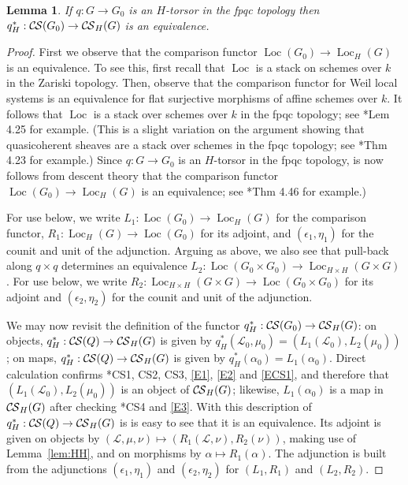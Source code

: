 \documentclass[10pt]{amsart}
\theoremstyle{plain}
\newtheorem{lemma}[theorem]{Lemma}
\theoremstyle{definition}
\newcommand{\Fq}{k}
\DeclareMathOperator{\Loc}{Loc}
\newcommand{\cs}[1]{{\mathcal{#1}}}
\newcommand{\CS}{{\mathcal{C\hskip-0.8pt S}}}
\begin{document}
\begin{lemma}\label{lem:torsor}
If $q : G \to G_0$ is an $H$-torsor in the fpqc topology 
then $q_H^*: \CS(G_0) \to \CS_H(G)$ is an equivalence.
\end{lemma}

\begin{proof}
First we observe that the comparison functor 
$\Loc(G_0) \to \Loc_H(G)$ is an equivalence.
To see this, first recall that $\Loc$ is a stack on schemes over $\Fq$ in the Zariski topology.
Then, observe that the comparison functor for Weil local systems is an equivalence for flat surjective morphisms of affine schemes over $\Fq$.
It follows that $\Loc$ is a stack over schemes over $\Fq$ in the fpqc topology; see \cite{Vistoli:notes}*{Lem 4.25} for example.
(This is a slight variation on the argument showing that quasicoherent sheaves are a stack over schemes in the fpqc topology; see \cite{Vistoli:notes}*{Thm 4.23} for example.)
Since $q : G\to G_0$ is an $H$-torsor in the fpqc topology, is now follows from descent theory that the comparison functor $\Loc(G_0) \to \Loc_H(G)$ is an equivalence; see \cite{Vistoli:notes}*{Thm 4.46} for example.)

For use below, we write $L_1 : \Loc(G_0) \to \Loc_H(G)$ for the comparison functor, $R_1 : \Loc_H(G) \to \Loc(G_0)$ for its adjoint, and $(\epsilon_1, \eta_1)$ for the counit and unit of the adjunction.
%
Arguing as above, we also see that pull-back along $q\times q$ determines an equivalence $L_2 : \Loc(G_0\times G_0) \to \Loc_{H\times H}(G\times G)$.
For use below, we write $R_2 : \Loc_{H\times H}(G\times G) \to \Loc(G_0\times G_0)$ for its adjoint and $(\epsilon_2, \eta_2)$ for the counit and unit of the adjunction.

We may now revisit the definition of the functor $q_H^*: \CS(G_0)\to \CS_H(G)$:
on objects, $q_H^*: \CS(Q)\to \CS_H(G)$ is given by $q_H^*(\cs{L}_0,\mu_0) = (L_1(\cs{L}_0), L_2(\mu_0))$; on maps, $q_H^*: \CS(Q)\to \CS_H(G)$ is given by $q_H^*(\alpha_0) = L_1(\alpha_0)$.
Direct calculation confirms \cite{cunningham-roe:13a}*{CS1, CS2, CS3}, \eqref{E1}, \eqref{E2} and \eqref{ECS1}, and therefore that $(L_1(\cs{L}_0), L_2(\mu_0))$ is an object of $\CS_H(G)$; 
likewise, $L_1(\alpha_0)$ is a map in $\CS_H(G)$ after checking \cite{cunningham-roe:13a}*{CS4} and \eqref{E3}.
%
With this description of $q_H^*: \CS(Q)\to \CS_H(G)$ is is easy to see that it is an equivalence.
Its adjoint is given on objects by $(\cs{L},\mu,\nu) \mapsto (R_1(\cs{L},\nu), R_2(\nu))$, making use of Lemma~\ref{lem:HH}, and on morphisms by $\alpha \mapsto R_1(\alpha)$.
The adjunction is built from the adjunctions $(\epsilon_1, \eta_1)$ and $(\epsilon_2, \eta_2)$ for $(L_1,R_1)$ and $(L_2, R_2)$.
\end{proof}
\end{document}
